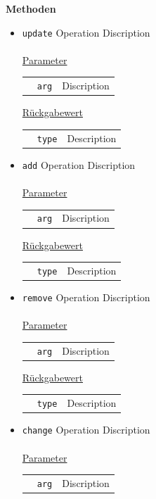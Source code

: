 \documentclass{article}
\begin{document}
\textbf{{Methoden}}
\begin{itemize}
\item \texttt{update} \newline Operation Discription
\\\\

\underline{{Parameter}} 
\begin{tabular}{lll}
 & \texttt{arg} & Discription \\
\end{tabular}

\underline{{Rückgabewert}}
\begin{tabular}{lll}
 & \texttt{type} & Description\\
\end{tabular}
\item \texttt{add} \newline Operation Discription
\\\\

\underline{{Parameter}} 
\begin{tabular}{lll}
 & \texttt{arg} & Discription \\
\end{tabular}

\underline{{Rückgabewert}}
\begin{tabular}{lll}
 & \texttt{type} & Description\\
\end{tabular}
\item \texttt{remove} \newline Operation Discription
\\\\

\underline{{Parameter}} 
\begin{tabular}{lll}
 & \texttt{arg} & Discription \\
\end{tabular}

\underline{{Rückgabewert}}
\begin{tabular}{lll}
 & \texttt{type} & Description\\
\end{tabular}
\item \texttt{change} \newline Operation Discription
\\\\

\underline{{Parameter}} 
\begin{tabular}{lll}
 & \texttt{arg} & Discription \\
\end{tabular}


\end{itemize}
\end{document}

